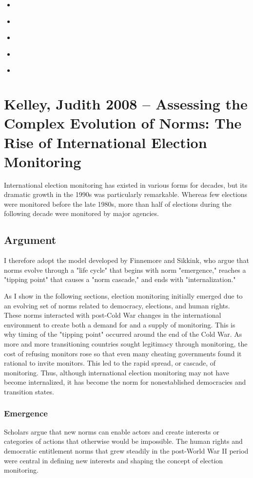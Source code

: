 \begin{itemize}
    \item [***] \textcite{kelleyAssessingComplexEvolution2008}
    \item \textcite{finnemoreInternationalNormDynamics1998}
    \item \textcite{bushInternationalPoliticsSpread2011}
    \item \textcite{mitchellNormsEarthChanging2019}
    \item \textcite{leschNormViolationsNorm2023}
\end{itemize}

\section{Kelley, Judith 2008 -- Assessing the Complex Evolution of Norms: The Rise of International Election Monitoring}

International election monitoring has existed in various forms for decades, but its dramatic growth in the 1990s was particularly remarkable. Whereas few elections were monitored before the late 1980s, more than half of elections during the following decade were monitored by major agencies.

\subsection{Argument}
I therefore adopt the model developed by Finnemore and Sikkink, who argue that norms evolve through a "life cycle" that begins with norm "emergence," reaches a "tipping point" that causes a "norm cascade," and ends with "internalization."

As I show in the following sections, election monitoring initially emerged due to an evolving set of norms related to democracy, elections, and human rights. These norms interacted with post-Cold War changes in the international environment to create both a demand for and a supply of monitoring. This is why timing of the "tipping point" occurred around the end of the Cold War. As more and more transitioning countries sought legitimacy through monitoring, the cost of refusing monitors rose so that even many cheating governments found it rational to invite monitors. This led to the rapid spread, or cascade, of monitoring. Thus, although international election monitoring may not have become internalized, it has become the norm for nonestablished democracies and transition states.

\subsubsection{Emergence}
Scholars argue that new norms can enable actors and create interests or categories of actions that otherwise would be impossible. The human rights and democratic entitlement norms that grew steadily in the post-World War II period were central in defining new interests and shaping the concept of election monitoring.

